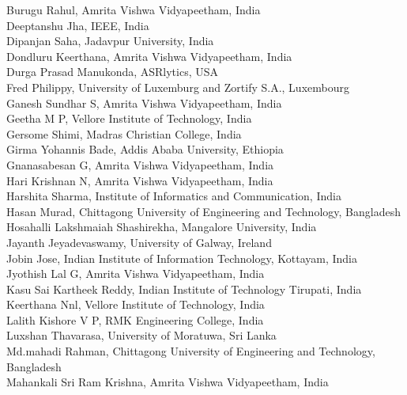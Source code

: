 \documentclass[11pt,oneside]{book}
\begin{document}
\begin{description}
              Burugu Rahul, Amrita Vishwa Vidyapeetham, India\\
              Deeptanshu Jha, IEEE, India\\
              Dipanjan Saha, Jadavpur University, India\\
              Dondluru Keerthana, Amrita Vishwa Vidyapeetham, India\\
              Durga Prasad Manukonda, ASRlytics, USA\\
              Fred Philippy, University of Luxemburg and Zortify S.A., Luxembourg\\
              Ganesh Sundhar S, Amrita Vishwa Vidyapeetham, India\\
              Geetha M P, Vellore Institute of Technology, India\\
              Gersome Shimi, Madras Christian College, India\\
              Girma Yohannis Bade, Addis Ababa University, Ethiopia\\
              Gnanasabesan G, Amrita Vishwa Vidyapeetham, India\\
              Hari Krishnan N, Amrita Vishwa Vidyapeetham, India\\
              Harshita Sharma, Institute of Informatics and Communication, India\\
              Hasan Murad, Chittagong University of Engineering and Technology, Bangladesh\\
              Hosahalli Lakshmaiah Shashirekha, Mangalore University, India\\
              Jayanth Jeyadevaswamy, University of Galway, Ireland\\
              Jobin Jose, Indian Institute of Information Technology, Kottayam, India\\
              Jyothish Lal G, Amrita Vishwa Vidyapeetham, India\\
              Kasu Sai Kartheek Reddy, Indian Institute of Technology Tirupati, India\\
              Keerthana Nnl, Vellore Institute of Technology, India\\
              Lalith Kishore V P, RMK Engineering College, India\\
              Luxshan Thavarasa, University of Moratuwa, Sri Lanka\\
              Md.mahadi Rahman, Chittagong University of Engineering and Technology, Bangladesh\\
              Mahankali Sri Ram Krishna, Amrita Vishwa Vidyapeetham, India\\

\end{description}
\end{document}
